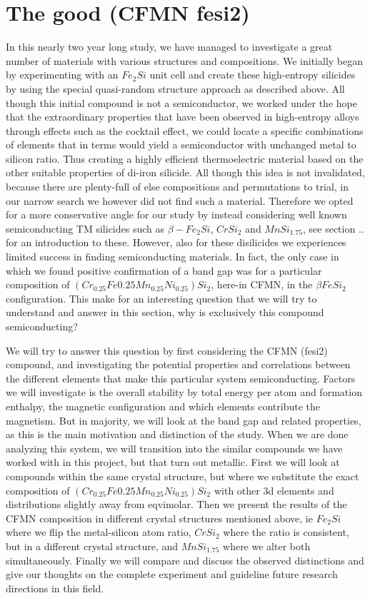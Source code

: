 \chapter{The good (CFMN fesi2)}
\label{sec:good}

In this nearly two year long study, we have managed to investigate a great number of materials with various structures and compositions. We initially began by experimenting with an $Fe_2Si$ unit cell and create these high-entropy silicides by using the special quasi-random structure approach as described above. All though this initial compound is not a semiconductor, we worked under the hope that the extraordinary properties that have been observed in high-entropy alloys through effects such as the cocktail effect, we could locate a specific combinations of elements that in terms would yield a semiconductor with unchanged metal to silicon ratio. Thus creating a highly efficient thermoelectric material based on the other suitable properties of di-iron silicide.  All though this idea is not invalidated, because there are plenty-full of else compositions and permutations to trial, in our narrow search we however did not find such a material. Therefore we opted for a more conservative angle for our study by instead considering well known semiconducting TM silicides such as $\beta - Fe_2Si$, $CrSi_2$ and $MnSi_{1.75}$, see section .. for an introduction to these. However, also for these disilicides we experiences limited success in finding semiconducting materials. In fact, the only case in which we found positive confirmation of a band gap was for a particular composition of $(Cr_{0.25}Fe{0.25}Mn_{0.25}Ni_{0.25})Si_2$, here-in CFMN, in the $\beta FeSi_2$ configuration. This make for an interesting question that we will try to understand and answer in this section, why is exclusively this compound semiconducting?  

We will try to answer this question by first considering the CFMN (fesi2) compound, and investigating the potential properties and correlations between the different elements that make this particular system semiconducting. Factors we will investigate is the overall stability by total energy per atom and formation enthalpy, the magnetic configuration and which elements contribute the magnetism. But in majority, we will look at the band gap and related properties, as this is the main motivation and distinction of the study. When we are done analyzing this system, we will transition into the similar compounds we have worked with in this project, but that turn out metallic. First we will look at compounds within the same crystal structure, but where we substitute the exact composition of $(Cr_{0.25}Fe{0.25}Mn_{0.25}Ni_{0.25})Si_2$ with other 3d elements and distributions slightly away from eqvimolar. Then we present the results of the CFMN composition in different crystal structures mentioned above, ie $Fe_2Si$ where we flip the metal-silicon atom ratio, $CrSi_2$ where the ratio is consistent, but in a different crystal structure, and $MnSi_{1.75}$ where we alter both simultaneously. Finally we will compare and discuss the observed distinctions and give our thoughts on the complete experiment and guideline future research directions in this field.     

